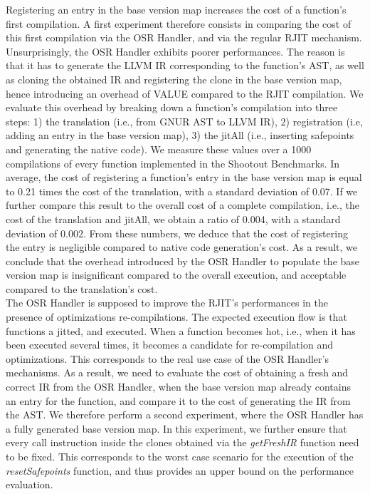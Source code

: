 Registering an entry in the base version map increases the cost of a function's first compilation.
A first experiment therefore consists in comparing the cost of this first compilation via the OSR Handler, and via the regular RJIT mechanism. 
Unsurprisingly, the OSR Handler exhibits poorer performances. 
The reason is that it has to generate the LLVM IR corresponding to the function's AST, as well as cloning the obtained IR and registering the clone in the base version map, hence introducing an overhead of VALUE compared to the RJIT compilation.
We evaluate this overhead by breaking down a function's compilation into three steps: 1) the translation (i.e., from GNUR AST to LLVM IR), 2) registration (i.e, adding an entry in the base version map), 3) the jitAll (i.e., inserting safepoints and generating the native code).
We measure these values over a 1000 compilations of every function implemented in the Shootout Benchmarks.
In average, the cost of registering a function's entry in the base version map is equal to 0.21 times the cost of the translation, with a standard deviation of 0.07.
If we further compare this result to the overall cost of a complete compilation, i.e., the cost of the translation and jitAll, we obtain a ratio of 0.004, with a standard deviation of 0.002. 
From these numbers, we deduce that the cost of registering the entry is negligible compared to native code generation's cost.   
As a result, we conclude that the overhead introduced by the OSR Handler to populate the base version map is insignificant compared to the overall execution, and acceptable compared to the translation's cost.\\


The OSR Handler is supposed to improve the RJIT's performances in the presence of optimizations re-compilations.
The expected execution flow is that functions a jitted, and executed. 
When a function becomes hot, i.e., when it has been executed several times, it becomes a candidate for re-compilation and optimizations.
This corresponds to the real use case of the OSR Handler's mechanisms.
As a result, we need to evaluate the cost of obtaining a fresh and correct IR from the OSR Handler, when the base version map already contains an entry for the function, and compare it to the cost of generating the IR from the AST.
We therefore perform a second experiment, where the OSR Handler has a fully generated base version map.
In this experiment, we further ensure that every call instruction inside the clones obtained via the \textit{getFreshIR} function need to be fixed.
This corresponds to the worst case scenario for the execution of the \textit{resetSafepoints} function, and thus provides an upper bound on the performance evaluation.\\

